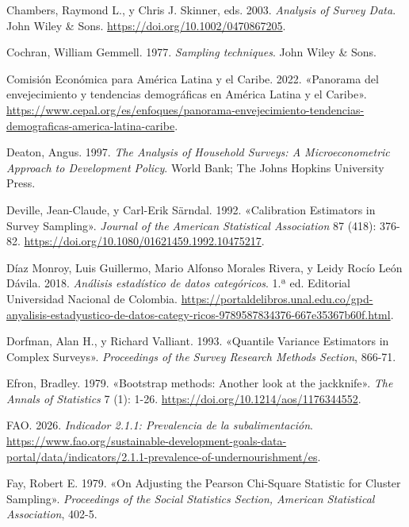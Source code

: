 \documentclass[
  spanish,
  11pt,
  letterpaper,
  oneside,
  open=any]{scrbook}
\newlength{\cslhangindent}
\newenvironment{CSLReferences}[2] %
 {\begin{list}{}{%
  \setlength{\itemindent}{0pt}
  \setlength{\leftmargin}{0pt}
  \setlength{\parsep}{0pt}
  \ifodd #1
   \setlength{\leftmargin}{\cslhangindent}
   \setlength{\itemindent}{-1\cslhangindent}
  \fi
  \setlength{\itemsep}{#2\baselineskip}}}
 {\end{list}}
\begin{document}
\begin{CSLReferences}{1}{1}
Chambers, Raymond L., y Chris J. Skinner, eds. 2003. \emph{Analysis of
Survey Data}. John Wiley \& Sons.
\url{https://doi.org/10.1002/0470867205}.

Cochran, William Gemmell. 1977. \emph{Sampling techniques}. John Wiley
\& Sons.

Comisión Económica para América Latina y el Caribe. 2022. {«Panorama del
envejecimiento y tendencias demográficas en América Latina y el
Caribe»}.
\url{https://www.cepal.org/es/enfoques/panorama-envejecimiento-tendencias-demograficas-america-latina-caribe}.

Deaton, Angus. 1997. \emph{The Analysis of Household Surveys: A
Microeconometric Approach to Development Policy}. World Bank; The Johns
Hopkins University Press.

Deville, Jean-Claude, y Carl-Erik Särndal. 1992. {«Calibration
Estimators in Survey Sampling»}. \emph{Journal of the American
Statistical Association} 87 (418): 376-82.
\url{https://doi.org/10.1080/01621459.1992.10475217}.

Díaz Monroy, Luis Guillermo, Mario Alfonso Morales Rivera, y Leidy Rocío
León Dávila. 2018. \emph{Análisis estadístico de datos categóricos}. 1.ª
ed. Editorial Universidad Nacional de Colombia.
\url{https://portaldelibros.unal.edu.co/gpd-anyalisis-estadyustico-de-datos-categy-ricos-9789587834376-667e35367b60f.html}.

Dorfman, Alan H., y Richard Valliant. 1993. {«Quantile Variance
Estimators in Complex Surveys»}. \emph{Proceedings of the Survey
Research Methods Section}, 866-71.

Efron, Bradley. 1979. {«Bootstrap methods: Another look at the
jackknife»}. \emph{The Annals of Statistics} 7 (1): 1-26.
\url{https://doi.org/10.1214/aos/1176344552}.

FAO. 2026. \emph{Indicador 2.1.1: Prevalencia de la subalimentación}.
\url{https://www.fao.org/sustainable-development-goals-data-portal/data/indicators/2.1.1-prevalence-of-undernourishment/es}.

Fay, Robert E. 1979. {«On Adjusting the Pearson Chi-Square Statistic for
Cluster Sampling»}. \emph{Proceedings of the Social Statistics Section,
American Statistical Association}, 402-5.


\end{CSLReferences}
\end{document}
